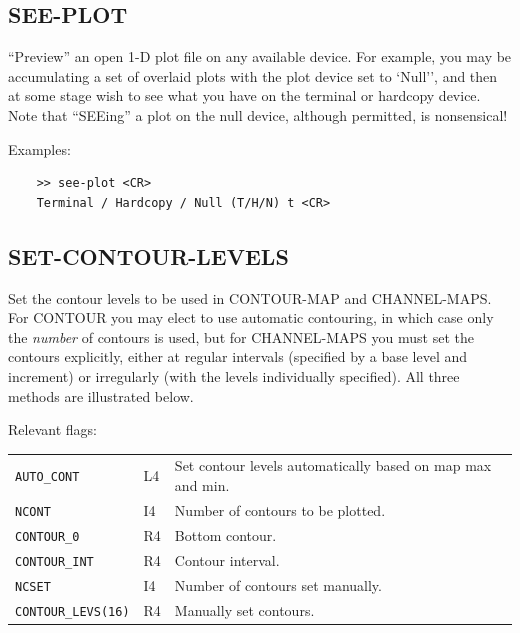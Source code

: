 \documentclass[11pt,twoside]{report}
\begin{document}
\subsection{SEE-PLOT} 

``Preview'' an open 1-D plot file on any available device. For example,
you may be accumulating a set of overlaid plots with the plot device set
to `Null'', and then at some stage wish to see  what you have on the
terminal or hardcopy device. Note that ``SEEing'' a plot on the null device,
although permitted, is nonsensical!

Examples:
\begin{verbatim}
    >> see-plot <CR>
    Terminal / Hardcopy / Null (T/H/N) t <CR>
\end{verbatim}

\subsection{SET-CONTOUR-LEVELS} 

Set the contour levels to be used in  CONTOUR-MAP and CHANNEL-MAPS.
 
For CONTOUR you may elect to use automatic contouring, in which case only
the {\em number} of contours is used, but for CHANNEL-MAPS you must set
the contours explicitly, either at regular intervals (specified by a base
level and increment) or irregularly (with the levels individually
specified). All three methods are illustrated below.

Relevant flags:\\
\begin{tabular}{lll}
  \verb+AUTO_CONT+ & L4 & Set contour levels automatically based on map max
                          and min.\\
  \verb+NCONT+     & I4 & Number of contours to be plotted.\\
  \verb+CONTOUR_0+ & R4 & Bottom contour.\\
  \verb+CONTOUR_INT+ & R4 & Contour interval.\\
  \verb+NCSET+     & I4 & Number of contours set manually.\\
  \verb+CONTOUR_LEVS(16)+ & R4 & Manually set contours.
\end{tabular}
\end{document}
